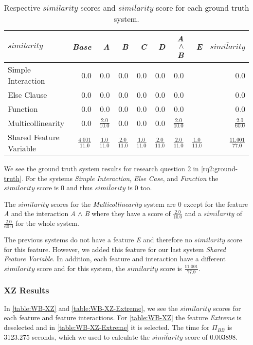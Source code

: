 \begin{table}[H]
    \centering
    \begin{tabular}{lrrrrrrrr}    \toprule
    $similarity$ & \emph{Base} & \emph{A} & \emph{B} & \emph{C} & \emph{D} & \emph{A} $\land$ \emph{B} & \emph{E} & $\overline{similarity}$ \\ \midrule
    Simple Interaction & 0.0 & 0.0 & 0.0 & 0.0 & 0.0 & 0.0 &  & 0.0  \\
    Else Clause & 0.0 & 0.0 & 0.0 & 0.0 & 0.0 & 0.0 & & 0.0 \\
    Function & 0.0 & 0.0 & 0.0 & 0.0 & 0.0 & 0.0 &  & 0.0\\
    Multicollinearity & 0.0 & $\frac{2.0}{10.0}$ & 0.0 & 0.0 & 0.0 & $\frac{2.0}{10.0}$  &  & $\frac{2.0}{60.0}$   \\
    Shared Feature Variable & $\frac{4.001}{11.0}$ & $\frac{1.0}{11.0}$ & $\frac{2.0}{11.0}$ &$\frac{1.0}{11.0}$ & $\frac{2.0}{11.0}$ & $\frac{2.0}{11.0}$ & $\frac{1.0}{11.0}$ & $\frac{11.001}{77.0}$ \\ \bottomrule
    \end{tabular}
    \caption{Respective $similarity$ scores and $\overline{similarity}$ score for each ground truth system.}
    \label{rq2:ground-truth}
\end{table}

We see the ground truth system results for research question 2 in \autoref{rq2:ground-truth}.  
For the systems \emph{Simple Interaction}, \emph{Else Case}, and \emph{Function} the $similarity$ score is $0$ and thus 
$\overline{similarity}$ is $0$ too. 

The $similarity$ scores for the \emph{Multicollinearity} system are $0$ except for the feature \emph{A} and the interaction
\emph{A} $\land$ \emph{B} where they have a score of $\frac{2.0}{10.0}$ and a $\overline{similarity}$ of $\frac{2.0}{60.0}$
for the whole system.

The previous systems do not have a feature \emph{E} and therefore no $similarity$ score for this feature. 
However, we added this feature for our last system \emph{Shared Feature Variable}. 
In addition, each feature and interaction have a different $similarity$ score and for this system, 
the $\overline{similarity}$ score is $\frac{11.001}{77.0}$.

\subsubsection*{XZ Results}

In \autoref{table:WB-XZ} and \autoref{table:WB-XZ-Extreme}, we see the $similarity$ scores for each feature and feature interactions.
For \autoref{table:WB-XZ} the feature \emph{Extreme} is deselected and in \autoref{table:WB-XZ-Extreme} it is selected.
The time for $\Pi_{BB}$ is 3123.275 seconds, which we used to calculate the $\overline{similarity}$ score of $0.003898$. 

